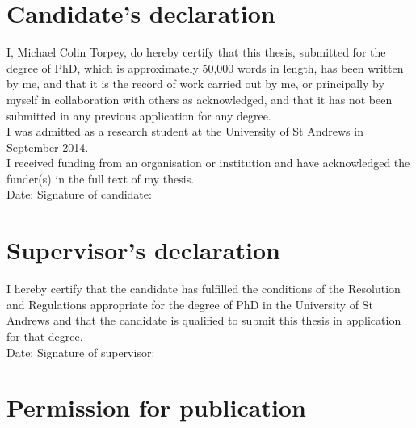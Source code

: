 

\vspace{-1.3em}
\section*{Candidate's declaration}

\noindent
I, Michael Colin Torpey, do hereby certify that this thesis, submitted for the
degree of PhD, which is approximately
50,000
words in length, has been written by me, and that it is the record of work
carried out by me, or principally by myself in collaboration with others as
acknowledged, and that it has not been submitted in any previous application for
any degree.
\\

\noindent
I was admitted as a research student at the University of St Andrews in
September 2014.
\\

\noindent
I received funding from an organisation or institution and have acknowledged the
funder(s) in the full text of my thesis.
\\

\vspace{0.85em}
\noindent
Date:\makebox[7em]{\dotfill}
Signature of candidate:\dotfill
\\

\vspace{-1.5em}
\section*{Supervisor's declaration}

\noindent
I hereby certify that the candidate has fulfilled the conditions of the
Resolution and Regulations appropriate for the degree of PhD in the University
of St Andrews and that the candidate is qualified to submit this thesis in
application for that degree.
\\

\vspace{0.85em}
\noindent
Date:\makebox[7em]{\dotfill}
Signature of supervisor:\dotfill
\\

\vspace{-1.5em}
\section*{Permission for publication}

